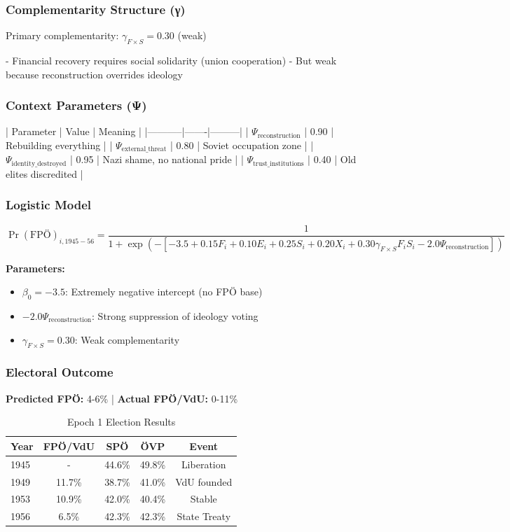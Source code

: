\subsubsection{Complementarity Structure (γ)}

Primary complementarity: $\gamma_{F \times S} = 0.30$ (weak)

- Financial recovery requires social solidarity (union cooperation)
- But weak because reconstruction overrides ideology

\subsubsection{Context Parameters (Ψ)}

| Parameter | Value | Meaning |
|-----------|-------|---------|
| $\Psi_{\text{reconstruction}}$ | 0.90 | Rebuilding everything |
| $\Psi_{\text{external\_threat}}$ | 0.80 | Soviet occupation zone |
| $\Psi_{\text{identity\_destroyed}}$ | 0.95 | Nazi shame, no national pride |
| $\Psi_{\text{trust\_institutions}}$ | 0.40 | Old elites discredited |

\subsubsection{Logistic Model}

$$\Pr(\text{FPÖ})_{i,1945-56} = \frac{1}{1 + \exp(-[-3.5 + 0.15 F_i + 0.10 E_i + 0.25 S_i + 0.20 X_i + 0.30 \gamma_{F \times S} F_i S_i - 2.0 \Psi_{\text{reconstruction}}])}$$

\textbf{Parameters:}
\begin{itemize}[nosep]
\item $\beta_0 = -3.5$: Extremely negative intercept (no FPÖ base)
\item $-2.0 \Psi_{\text{reconstruction}}$: Strong suppression of ideology voting
\item $\gamma_{F \times S} = 0.30$: Weak complementarity
\end{itemize}

\subsubsection{Electoral Outcome}

\textbf{Predicted FPÖ:} 4-6\% | \textbf{Actual FPÖ/VdU:} 0-11\%

\begin{table}[h]
\centering
\caption{Epoch 1 Election Results}
\label{tab:epoch1-results}
\begin{tabular}{lcccc}
\toprule
Year & FPÖ/VdU & SPÖ & ÖVP & Event \\
\midrule
1945 & - & 44.6\% & 49.8\% & Liberation \\
1949 & 11.7\% & 38.7\% & 41.0\% & VdU founded \\
1953 & 10.9\% & 42.0\% & 40.4\% & Stable \\
1956 & 6.5\% & 42.3\% & 42.3\% & State Treaty \\
\bottomrule
\end{tabular}
\end{table}

